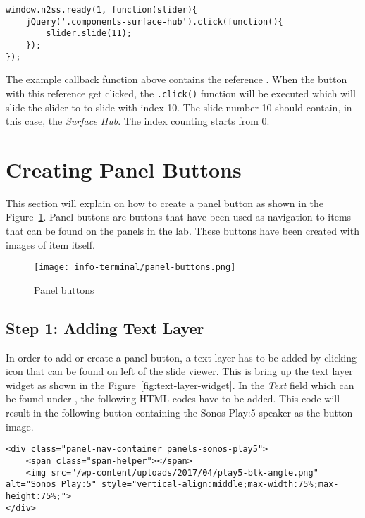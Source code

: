 \begin{lstlisting}
window.n2ss.ready(1, function(slider){
	jQuery('.components-surface-hub').click(function(){
		slider.slide(11);
	});
});
\end{lstlisting}

The example callback function above contains the reference . When the button with this reference get clicked, the \texttt{.click()} function will be executed which will slide the slider to to slide with index 10. The slide number 10 should contain, in this case, the \emph{Surface Hub}. The index counting starts from 0.

\section{Creating Panel Buttons}
This section will explain on how to create a panel button as shown in the Figure~\ref{fig:panel-buttons}. Panel buttons are buttons that have been used as navigation to items that can be found on the panels in the lab. These buttons have been created with images of item itself.

\begin{figure}[ht]
\caption{Panel buttons}
\label{fig:panel-buttons}
\centering
\texttt{[image: info-terminal/panel-buttons.png]}
\end{figure}

\subsection*{Step 1: Adding Text Layer}
In order to add or create a panel button, a text layer has to be added by clicking  icon that can be found on left of the slide viewer. This is bring up the text layer widget as shown in the Figure~\ref{fig:text-layer-widget}. In the \emph{Text} field which can be found under , the following HTML codes have to be added. This code will result in the following button containing the Sonos Play:5 speaker as the button image.

\begin{lstlisting}
<div class="panel-nav-container panels-sonos-play5">
	<span class="span-helper"></span>
	<img src="/wp-content/uploads/2017/04/play5-blk-angle.png" alt="Sonos Play:5" style="vertical-align:middle;max-width:75%;max-height:75%;">
</div>
\end{lstlisting}


